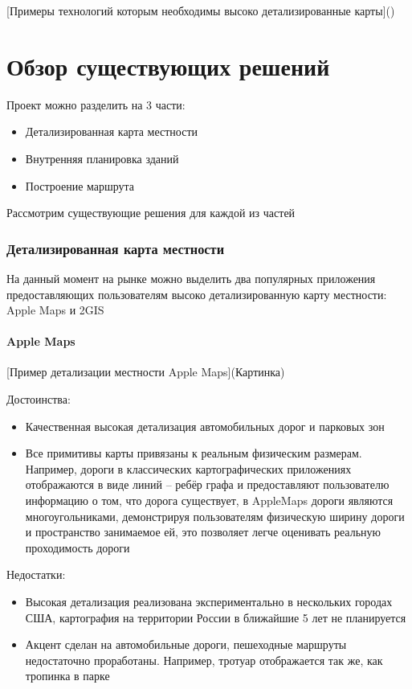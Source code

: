     [Примеры технологий которым необходимы высоко детализированные карты]()

  \section{Обзор существующих решений}
    Проект можно разделить на 3 части:
    \begin{itemize}
      \item Детализированная карта местности
      \item Внутренняя планировка зданий
      \item Построение маршрута
    \end{itemize}


    Рассмотрим существующие решения для каждой из частей

    \subsubsection{Детализированная карта местности}
      На данный момент на рынке можно выделить два популярных приложения предоставляющих пользователям высоко детализированную карту местности: Apple Maps и 2GIS
      \paragraph{Apple Maps}
        [Пример детализации местности Apple Maps](Картинка)

        \noindent Достоинства:
        \begin{itemize}
          \item Качественная высокая детализация автомобильных дорог и парковых зон
          \item Все примитивы карты привязаны к реальным физическим размерам. Например, дороги в классических картографических приложениях отображаются в виде линий -- ребёр графа и предоставляют пользователю информацию о том, что дорога существует, в AppleMaps дороги являются многоугольниками, демонстрируя пользователям физическую ширину дороги и пространство занимаемое ей, это позволяет легче оценивать реальную проходимость дороги
        \end{itemize}

        \noindent Недостатки:
        \begin{itemize}
          \item Высокая детализация реализована экспериментально в нескольких городах США, картография на территории России в ближайшие 5 лет не планируется
          \item Акцент сделан на автомобильные дороги, пешеходные маршруты недостаточно проработаны. Например, тротуар отображается так же, как тропинка в парке
        \end{itemize}


